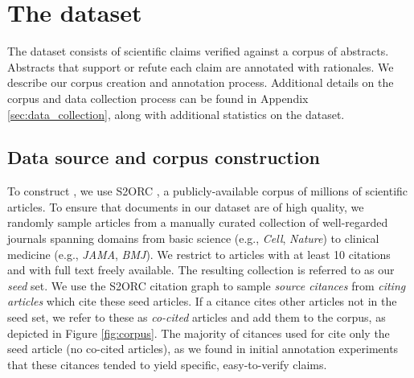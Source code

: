 \section{The \ours dataset} \label{sec:dataset}

\label{sec:dataset_overview}

The \ours dataset consists of \numclaims scientific claims verified against a corpus of \numpapers abstracts.  Abstracts that support or refute each claim are annotated with rationales.  We describe our corpus creation and annotation process. Additional details on the corpus and data collection process can be found in Appendix \ref{sec:data_collection}, along with additional statistics on the dataset.


\subsection{Data source and corpus construction}
\label{sec:data_source}

To construct \ours, we use S2ORC \cite{Lo2019GORCAL}, a publicly-available corpus of millions of scientific articles. To ensure that documents in our dataset are of high quality, we randomly sample articles from a manually curated collection of well-regarded journals spanning domains from basic science (e.g., \emph{Cell}, \emph{Nature}) to clinical medicine (e.g., \emph{JAMA}, \emph{BMJ}). We restrict to articles with at least 10 citations and with full text freely available. The resulting collection is referred to as our \textit{seed} set. We use the S2ORC citation graph to sample \emph{source citances} from \emph{citing articles} which cite these seed articles. If a citance cites other articles not in the seed set, we refer to these as \emph{co-cited} articles and add them to the corpus, as depicted in Figure \ref{fig:corpus}. The majority of citances used for \ours cite only the seed article (no co-cited articles), as we found in initial annotation experiments that these citances tended to yield specific, easy-to-verify claims.




